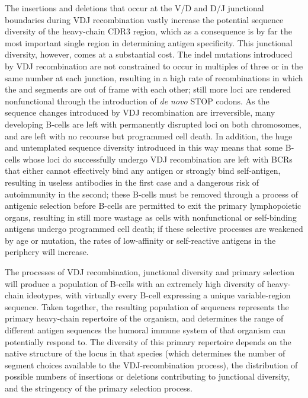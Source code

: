 The insertions and deletions that occur at the V/D and D/J junctional boundaries during VDJ recombination vastly increase the potential sequence diversity of the heavy-chain CDR3 region, which as a consequence is by far the most important single region in determining antigen specificity. This junctional diversity, however, comes at a substantial cost. The indel mutations introduced by VDJ recombination are not constrained to occur in multiples of three or in the same number at each junction, resulting in a high rate of recombinations in which the \vh and \jh segments are out of frame with each other; still more loci are rendered nonfunctional through the introduction of \textit{de novo} STOP codons. As the sequence changes introduced by VDJ recombination are irreversible, many developing B-cells are left with permanently disrupted \igh{} loci on both chromosomes, and are left with no recourse but programmed cell death. In addition, the huge and untemplated sequence diversity introduced in this way means that some B-cells whose \igh{} loci do successfully undergo VDJ recombination are left with BCRs that either cannot effectively bind any antigen or strongly bind self-antigen, resulting in useless antibodies in the first case and a dangerous risk of autoimmunity in the second; these B-cells must be removed through a process of antigenic selection before \naive B-cells are permitted to exit the primary lymphopoietic organs, resulting in still more wastage as cells with nonfunctional or self-binding antigens undergo programmed cell death; if these selective processes are weakened by age or mutation, the rates of low-affinity or self-reactive antigens in the periphery will increase. %

The processes of VDJ recombination, junctional diversity and primary selection will produce a population of \naive B-cells with an extremely high diversity of heavy-chain ideotypes, with virtually every \naive B-cell expressing a unique variable-region sequence. Taken together, the resulting population of sequences represents the primary heavy-chain repertoire of the organism, and determines the range of different antigen sequences the humoral immune system of that organism can potentially respond to. The diversity of this primary repertoire depends on the native structure of the \igh{} locus in that species (which determines the number of segment choices available to the VDJ-recombination process), the distribution of possible numbers of insertions or deletions contributing to junctional diversity, and the stringency of the primary selection process.

